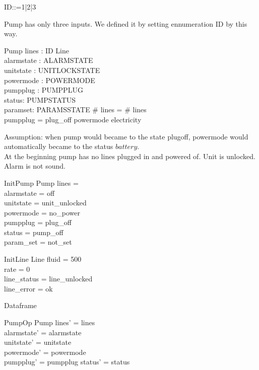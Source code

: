 \documentclass{article}
\begin{document}
	\begin{zed}
		ID::=1|2|3
	\end{zed}
	Pump has only three inputs. We defined it by setting ennumeration ID by this way.	
	\begin{schema}{Pump}
		lines : ID \pfun Line \\
		alarmstate : ALARMSTATE \\
		unitstate : UNITLOCKSTATE \\
		powermode : POWERMODE \\
		pumpplug : PUMPPLUG \\
		status: PUMPSTATUS \\
		paramset: PARAMSSTATE
	\where
		\# \ran lines = \# \dom lines \\
		pumpplug = plug\_off \implies powermode \neq electricity 
	\end{schema}
	
	Assumption: when pump would became to the state plugoff, powermode would automatically became to the status $battery$.\\
	
	At the beginning pump has no lines plugged in and powered of.
	Unit is unlocked. Alarm is not sound. 
		
	
	\begin{schema}{InitPump}
		Pump
		\where
		lines = \emptyset \\
		alarmstate = off \\
		unitstate  = unit\_unlocked \\
		powermode =  no\_power \\
		pumpplug = plug\_off \\
		status = pump\_off\\
		param\_set = not\_set	
	\end{schema}
	
	\begin{schema}{InitLine}
		Line
		\where
		fluid = 500 \\
		rate = 0 \\
		line\_status = line\_unlocked\\
		line\_error = ok \\
	\end{schema}

	Dataframe
	\begin{schema}{PumpOp}
		\Delta Pump
	\where
    	lines' = lines  \\
    	alarmstate' = alarmstate \\
    	unitstate' = unitstate \\
    	powermode' = powermode \\
    	pumpplug' = pumpplug
    	status' = status \\
    \end{schema}
	
\end{document}
